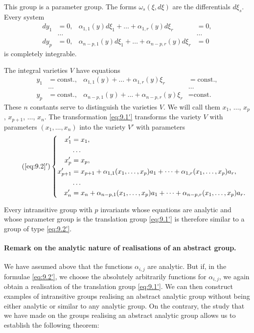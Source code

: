 \documentclass[leqno,11pt]{book}
\numberwithin{equation}{chapter}
\theoremstyle{shape1}
\theoremstyle{shapesmall}
\begin{document}
This group is a parameter group. The forms $\omega_{s}(\xi,d\xi)$ are the differentials $d\xi_{s}$. Every system
\begin{align*}
  dy_{1}&=0,&\alpha_{1,1}(y)d\xi_{1}+\dots+\alpha_{1,r}(y)d\xi_{r}&=0,\\
  &\dots&&\dots\\
  dy_{p}&=0,&\alpha_{n-p,1}(y)d\xi_{1}+\dots+\alpha_{n-p,r}(y)d\xi_{r}&=0
\end{align*}
is completely integrable.

The integral varieties $V$ have equations
\begin{align*}
  y_{1}&=\text{const.},&\alpha_{1,1}(y)+\dots+\alpha_{1,r}(y)\xi_{r}&=\text{const.},\\
  &\dots&&\dots\\
  y_{p}&=\text{const.},&\alpha_{n-p,1}(y)+\dots+\alpha_{n-p,r}(y)\xi_{r}&=\text{const.}
\end{align*}
These $n$ constants serve to distinguish the varieties $V$. We will call them $x_{1}$, $\dots$, $x_{p}$, $x_{p+1}$, $\dots$, $x_{n}$. The transformation \eqref{eq:9.1'} transforms the variety $V$ with parameters $(x_{1}, \dots, x_{n})$ into the variety $V'$ with parameters
\begin{equation}
  \label{eq:9.2'}\tag{\ref{eq:9.2}$'$}
  \left\{
    \begin{aligned}
      x'_{1}&=x_{1},\\
      &\dots\\
      x'_{p}&=x_{p},\\
      x'_{p+1}&=x_{p+1}+\alpha_{1,1}(x_{1},\dots,x_{p})a_{1}+\dots+\alpha_{1,r}(x_{1},\dots,x_{p})a_{r},\\
      &\dots\\
      x'_{n}&=x_{n}+\alpha_{n-p,1}(x_{1},\dots,x_{p})a_{1}+\dots+\alpha_{n-p,r}(x_{1},\dots,x_{p})a_{r}.      
    \end{aligned}
  \right.
\end{equation}

Every intransitive group with $p$ invariants whose equations are analytic and whose parameter group is the translation group \eqref{eq:9.1'} is therefore similar to a group of type \eqref{eq:9.2'}.



\paragraph{Remark on the analytic nature of realisations of an abstract group.}
\label{sec:121}
We have assumed above that the functions $\alpha_{i,j}$ are analytic. But if, in the formulae \eqref{eq:9.2'}, we choose the absolutely arbitrarily functions for $\alpha_{i,j}$, we again obtain a realisation of the translation group \eqref{eq:9.1'}. We can then construct examples of intransitive groups realising an abstract analytic group without being either analytic or similar to any analytic group. On the contrary, the study that we have made on the groups realising an abstract analytic group allows us to establish the following theorem:
\end{document}
